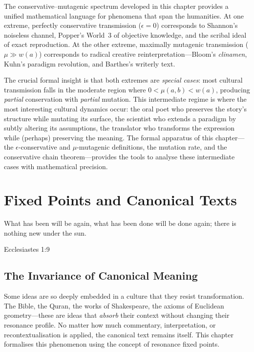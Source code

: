 \begin{interpretation}
\label{interp:ch9:spectrum_summary}
The conservative--mutagenic spectrum developed in this chapter provides a
unified mathematical language for phenomena that span the humanities.  At one
extreme, perfectly conservative transmission ($\epsilon = 0$) corresponds to
Shannon's noiseless channel, Popper's World~3 of objective knowledge, and
the scribal ideal of exact reproduction.  At the other extreme, maximally
mutagenic transmission ($\mu \gg w(a)$) corresponds to radical creative
reinterpretation---Bloom's \emph{clinamen}, Kuhn's paradigm revolution, and
Barthes's writerly text.

The crucial formal insight is that both extremes are \emph{special cases}:
most cultural transmission falls in the moderate region where $0 < \mu(a,b)
< w(a)$, producing \emph{partial} conservation with \emph{partial} mutation.
This intermediate regime is where the most interesting cultural dynamics
occur: the oral poet who preserves the story's structure while mutating its
surface, the scientist who extends a paradigm by subtly altering its
assumptions, the translator who transforms the expression while (perhaps)
preserving the meaning.  The formal apparatus of this chapter---the
$\epsilon$-conservative and $\mu$-mutagenic definitions, the mutation rate,
and the conservative chain theorem---provides the tools to analyse these
intermediate cases with mathematical precision.
\end{interpretation}





\chapter{Fixed Points and Canonical Texts}
\label{ch:fixed-points}

\epigraph{What has been will be again, what has been done will be done again;
there is nothing new under the sun.}{Ecclesiastes 1:9}

\section{The Invariance of Canonical Meaning}

Some ideas are so deeply embedded in a culture that they resist transformation.
The Bible, the Quran, the works of Shakespeare, the axioms of Euclidean
geometry---these are ideas that \emph{absorb} their context without changing
their resonance profile.  No matter how much commentary, interpretation, or
recontextualisation is applied, the canonical text remains itself.  This
chapter formalises this phenomenon using the concept of resonance fixed points.

